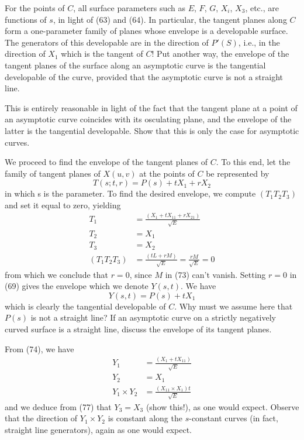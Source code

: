 \documentclass{book}
\begin{document}
For the points of $C$, all surface parameters such as $E$, $F$, $G$, $X_{i}$, $X_{3}$, etc., are functions of $s$, in light of (63) and (64). In particular, the tangent planes along $C$ form a one-parameter family of planes whose envelope is a developable surface. The generators of this developable are in the direction of $P'(S)$, i.e., in the direction of $X_{1}$ which is the tangent of $C$! Put another way, the envelope of the tangent planes of the surface along an asymptotic curve is the tangential developable of the curve, provided that the asymptotic curve is not a straight line.

This is entirely reasonable in light of the fact that the tangent plane at a point of an asymptotic curve coincides with its osculating plane, and the envelope of the latter is the tangential developable. Show that this is only the case for asymptotic curves.

We proceed to find the envelope of the tangent planes of $C$. To this end, let the family of tangent planes of $X(u,v)$ at the points of $C$ be represented by
\begin{equation}
T(s;t,r) = P(s) + tX_{1} + rX_{2}
\end{equation}
in which s is the parameter. To find the desired envelope, we compute $(T_{1} T_{2} T_{3})$ and set it equal to zero, yielding
\begin{align}
T_{1} & = \frac{(X_{1} + tX_{11} + rX_{21})}{\sqrt{E}} \\
T_{2} & = X_{1} \\
T_{3} & = X_{2} \\
(T_{1} T_{2} T_{3}) & = \frac{(tL + rM)}{\sqrt{E}} = \frac{rM}{\sqrt{E}} = 0
\end{align}
from which we conclude that $r = 0$, since $M$ in (73) can't vanish. Setting $r = 0$ in (69) gives the envelope which we denote $Y(s,t)$. We have
\begin{equation}
Y(s,t) = P(s) + tX_{1}
\end{equation}
which is clearly the tangential developable of $C$. Why must we assume here that $P(s)$ is not a straight line? If an asymptotic curve on a strictly negatively curved surface is a straight line, discuss the envelope of its tangent planes.

From (74), we have
\begin{align}
Y_{1} & = \frac{(X_{1} + tX_{11})}{\sqrt{E}} \\
Y_{2} & = X_{1} \\
Y_{1} \times Y_{2} & = \frac{(X_{11} \times X_{1})t}{\sqrt{E}}
\end{align}
and we deduce from (77) that $Y_{3} = X_{3}$ (show this!), as one would expect. Observe that the direction of $Y_{1} \times Y_{2}$ is constant along the $s$-constant curves (in fact, straight line generators), again as one would expect.
\end{document}
